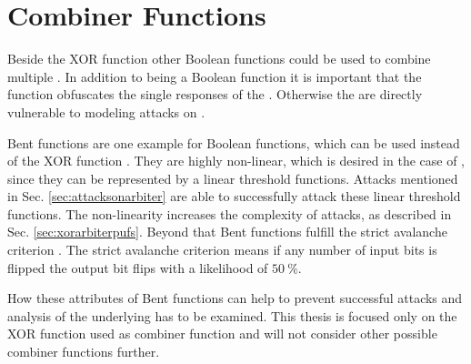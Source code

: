 \section{Combiner Functions}
\label{sec:combinerfunctions}

Beside the \ac{XOR} function other Boolean functions could be used to combine multiple \apuf.
In addition to being a Boolean function it is important that the function obfuscates the single responses of the \apufs. Otherwise the \apufs are directly vulnerable to modeling attacks on \apufs.

Bent functions are one example for Boolean functions, which can be used instead of the \ac{XOR} function \cite{Adams1990Thedesign,Forre1990Thedefinition,Seberry1993Highlycriterion}.
They are highly non-linear, which is desired in the case of \apufs, since they can be represented by a linear threshold functions.
Attacks mentioned in Sec. \ref{sec:attacksonarbiter} are able to successfully attack these linear threshold functions.
The non-linearity increases the complexity of attacks, as described in Sec. \ref{sec:xorarbiterpufs}. %
Beyond that Bent functions fulfill the strict avalanche criterion \cite{Feistel1973Cryptographyprivacy}.
The strict avalanche criterion means if any number of input bits is flipped the output bit flips with a likelihood of $50\ \%$.

How these attributes of Bent functions can help to prevent successful attacks and analysis of the underlying \apufs has to be examined.
This thesis is focused only on the \ac{XOR} function used as combiner function and will not consider other possible combiner functions further.

